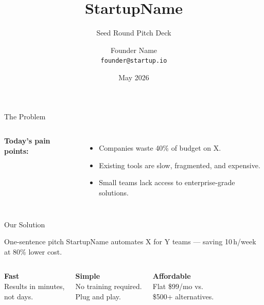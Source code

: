 \documentclass[aspectratio=169]{beamer}
\title{StartupName}
\subtitle{Seed Round Pitch Deck}
\author{Founder Name \\ \texttt{founder@startup.io}}
\institute{}
\date{May 2026}
\begin{document}
\begin{frame}
  \titlepage
\end{frame}

\begin{frame}{The Problem}
  \begin{columns}[T]
    \textbf{Today's pain points:}
    \begin{itemize}
      \item Companies waste 40\% of budget on X.
      \item Existing tools are slow, fragmented, and expensive.
      \item Small teams lack access to enterprise-grade solutions.
    \end{itemize}

  \end{columns}
\end{frame}

\begin{frame}{Our Solution}
  \begin{alertblock}{One-sentence pitch}
    StartupName automates X for Y teams --- saving 10\,h/week at 80\% lower cost.
  \end{alertblock}

  \vspace{0.8em}
  \begin{columns}[T]
    \centering
    \textbf{Fast}\\[0.3em]
    Results in minutes,\\not days.

    \centering
    \textbf{Simple}\\[0.3em]
    No training required.\\Plug and play.

    \centering
    \textbf{Affordable}\\[0.3em]
    Flat \$99/mo vs.\\\$500+ alternatives.
  \end{columns}
\end{frame}
\end{document}
